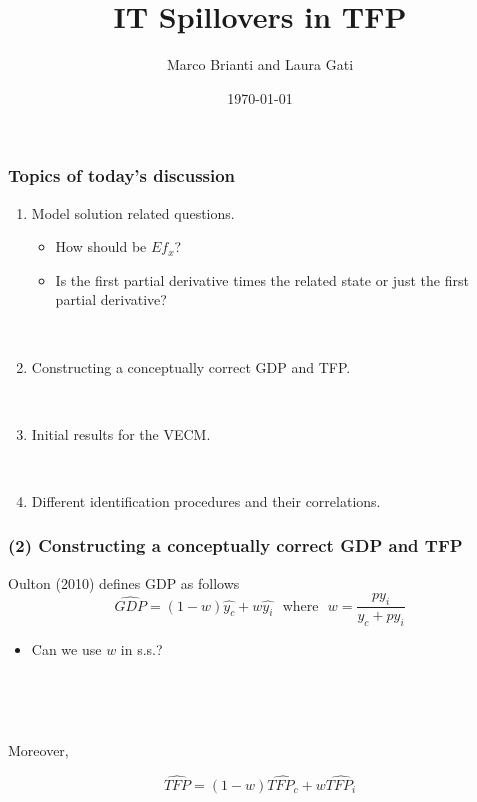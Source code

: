 \documentclass{beamer}
\author[Brianti, Gati]{Marco Brianti and Laura Gati}
\institute[Boston College]{Boston College}
\title{IT Spillovers in TFP }
\date{\today}
\begin{document}
\begin{frame}

\maketitle


\end{frame}

\begin{frame}
\frametitle{Topics of today's discussion}

\begin{enumerate}
\item Model solution related questions. 

\begin{itemize}
	\item How should be $Ef_x$?
	\item Is the first partial derivative times the related state or just the first partial derivative?
	\end{itemize}

\

\item Constructing a conceptually correct GDP and TFP.

\

\item Initial results for the VECM.

\

\item Different identification procedures and their correlations.
\end{enumerate}


\end{frame}


\begin{frame}
\frametitle{(2) Constructing a conceptually correct GDP and TFP}

Oulton (2010) defines GDP as follows
$$
\hat{GDP} = (1 - w) \hat{y_c} + w \hat{y_i} \ \ \ \text{where} \ \ \ w = \frac{p y_i}{y_c + p y_i}
$$
\begin{itemize}
	\item Can we use $w$ in s.s.?
\end{itemize}

\

\


Moreover, 


$$
\hat{TFP} = (1 - w) \hat{TFP_c} + w \hat{TFP_i} 
$$


\end{frame}
\end{document}

